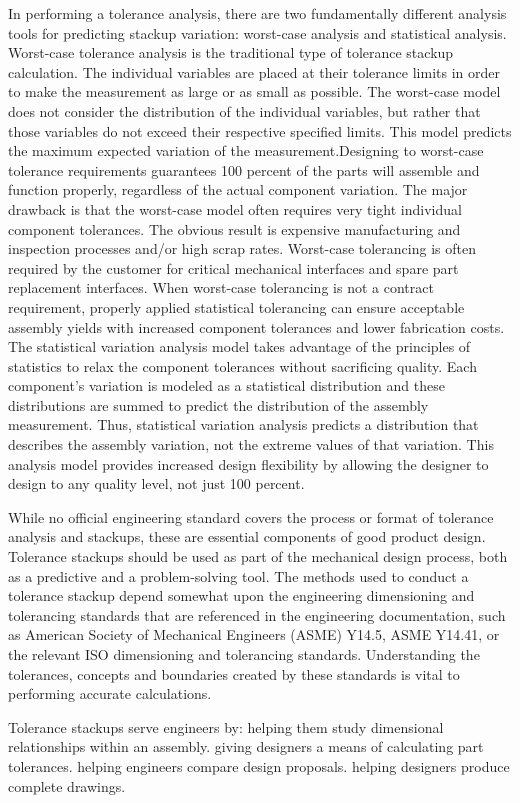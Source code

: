 In performing a tolerance analysis, there are two fundamentally different analysis tools for predicting stackup variation: worst-case analysis and statistical analysis. Worst-case tolerance analysis is the traditional type of tolerance stackup calculation. The individual variables are placed at their tolerance limits in order to make the measurement as large or as small as possible. The worst-case model does not consider the distribution of the individual variables, but rather that those variables do not exceed their respective specified limits. This model predicts the maximum expected variation of the measurement.Designing to worst-case tolerance requirements guarantees 100 percent of the parts will assemble and function properly, regardless of the actual component variation. The major drawback is that the worst-case model often requires very tight individual component tolerances. The obvious result is expensive manufacturing and inspection processes and/or high scrap rates. Worst-case tolerancing is often required by the customer for critical mechanical interfaces and spare part replacement interfaces. When worst-case tolerancing is not a contract requirement, properly applied statistical tolerancing can ensure acceptable assembly yields with increased component tolerances and lower fabrication costs. The statistical variation analysis model takes advantage of the principles of statistics to relax the component tolerances without sacrificing quality. Each component’s variation is modeled as a statistical distribution and these distributions are summed to predict the distribution of the assembly measurement. Thus, statistical variation analysis predicts a distribution that describes the assembly variation, not the extreme values of that variation. This analysis model provides increased design flexibility by allowing the designer to design to any quality level, not just 100 percent.
 
While no official engineering standard covers the process or format of tolerance analysis and stackups, these are essential components of good product design. Tolerance stackups should be used as part of the mechanical design process, both as a predictive and a problem-solving tool. The methods used to conduct a tolerance stackup depend somewhat upon the engineering dimensioning and tolerancing standards that are referenced in the engineering documentation, such as American Society of Mechanical Engineers (ASME) Y14.5, ASME Y14.41, or the relevant ISO dimensioning and tolerancing standards. Understanding the tolerances, concepts and boundaries created by these standards is vital to performing accurate calculations.
 
Tolerance stackups serve engineers by:
 helping them study dimensional relationships within an assembly.
 giving designers a means of calculating part tolerances.
 helping engineers compare design proposals.
 helping designers produce complete drawings.
